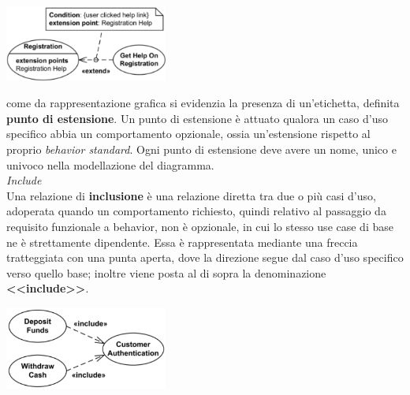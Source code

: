 \documentclass{article}
\begin{document}
\begin{center}
    \includegraphics[width=0.4\textwidth]{foto 4.png}
\end{center}
come da rappresentazione grafica si evidenzia la presenza di un'etichetta, definita \textbf{punto di estensione}. Un punto di estensione è attuato qualora un caso d'uso specifico abbia un comportamento opzionale, ossia un'estensione rispetto al proprio \textit{behavior standard}. Ogni punto di estensione deve avere un nome, unico e univoco nella modellazione del diagramma.\vspace*{14pt}\\
\textit{Include}\\Una relazione di \textbf{inclusione} è una relazione diretta tra due o più casi d'uso, adoperata quando un comportamento richiesto, quindi relativo al passaggio da requisito funzionale a behavior, non è opzionale, in cui lo stesso use case di base ne è strettamente dipendente. Essa è rappresentata mediante una freccia tratteggiata con una punta aperta, dove la direzione segue dal caso d'uso specifico verso quello base; inoltre viene posta al di sopra la denominazione \textbf{<<include>>}.
\begin{center}
    \includegraphics[width=0.4\textwidth]{foto 5.png}
\end{center}
\end{document}
